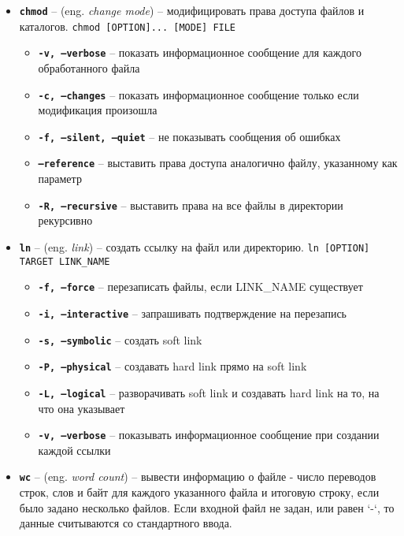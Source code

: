 \documentclass[12pt, a4paper]{article}
\begin{document}
\begin{itemize}
\begin{itemize}
  \end{itemize}
  \item \textbf{\texttt{chmod}} -- (eng. \textit{change mode}) -- модифицировать
    права доступа файлов и каталогов. \texttt{chmod [OPTION]... [MODE] FILE}
  \begin{itemize}
    \item \textbf{\texttt{-v, --verbose}} -- показать информационное сообщение
      для каждого обработанного файла
    \item \textbf{\texttt{-c, --changes}} -- показать информационное сообщение
      только если модификация произошла
    \item \textbf{\texttt{-f, --silent, --quiet}} -- не показывать сообщения об
      ошибках
    \item \textbf{\texttt{--reference}} -- выставить права доступа аналогично
      файлу, указанному как параметр
    \item \textbf{\texttt{-R, --recursive}} -- выставить права на все файлы в
      директории рекурсивно
  \end{itemize}
  \item \textbf{\texttt{ln}} -- (eng. \textit{link}) -- создать ссылку на файл
    или директорию. \texttt{ln [OPTION] TARGET LINK\_NAME}
  \begin{itemize}
    \item \textbf{\texttt{-f, --force}} -- перезаписать файлы, если LINK\_NAME
      существует
    \item \textbf{\texttt{-i, --interactive}} -- запрашивать подтверждение на
      перезапись
    \item \textbf{\texttt{-s, --symbolic}} -- создать soft link
    \item \textbf{\texttt{-P, --physical}} -- создавать hard link прямо на
      soft link
    \item \textbf{\texttt{-L, --logical}} -- разворачивать soft link и создавать
      hard link на то, на что она указывает
    \item \textbf{\texttt{-v, --verbose}} -- показывать информационное сообщение
      при создании каждой ссылки
  \end{itemize}
  \item \textbf{\texttt{wc}} -- (eng. \textit{word count}) -- вывести информацию
    о файле -  число переводов строк, слов и байт для каждого указанного файла
    и итоговую строку, если было задано несколько файлов. Если входной файл не
    задан, или равен ‘-‘, то данные считываются со стандартного ввода.

\end{itemize}
\end{document}
